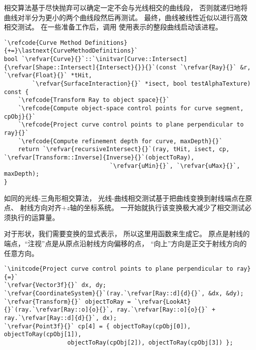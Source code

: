相交算法基于尽快抛弃可以确定一定不会与光线相交的曲线段，
否则就递归地将曲线对半分为更小的两个曲线段然后再测试。
最终，曲线被线性近似以进行高效相交测试。
在一些准备工作后，调用
使用表示的整段曲线启动该进程。
\begin{lstlisting}
`\refcode{Curve Method Definitions}{+=}\lastnext{CurveMethodDefinitions}`
bool `\refvar{Curve}{}`::`\initvar[Curve::Intersect]{\refvar[Shape::Intersect]{Intersect}{}}{}`(const `\refvar{Ray}{}` &r, `\refvar{Float}{}` *tHit,
        `\refvar{SurfaceInteraction}{}` *isect, bool testAlphaTexture) const {
    `\refcode{Transform Ray to object space}{}`
    `\refcode{Compute object-space control points for curve segment, cpObj}{}`
    `\refcode{Project curve control points to plane perpendicular to ray}{}`
    `\refcode{Compute refinement depth for curve, maxDepth}{}`
    return `\refvar{recursiveIntersect}{}`(ray, tHit, isect, cp, `\refvar[Transform::Inverse]{Inverse}{}`(objectToRay),
                              `\refvar{uMin}{}`, `\refvar{uMax}{}`, maxDepth);
}
\end{lstlisting}

如同的光线-三角形相交算法，
光线-曲线相交测试基于把曲线变换到射线端点在原点、
射线方向对齐$+z$轴的坐标系统。
一开始就执行该变换极大减少了相交测试必须执行的运算量。

对于形状，我们需要变换的显式表示，
所以这里用函数来生成它。
原点是射线的端点，“注视”点是从原点沿射线方向偏移的点，
“向上”方向是正交于射线方向的任意方向。
\begin{lstlisting}
`\initcode{Project curve control points to plane perpendicular to ray}{=}`
`\refvar{Vector3f}{}` dx, dy;
`\refvar{CoordinateSystem}{}`(ray.`\refvar[Ray::d]{d}{}`, &dx, &dy);
`\refvar{Transform}{}` objectToRay = `\refvar{LookAt}{}`(ray.`\refvar[Ray::o]{o}{}`, ray.`\refvar[Ray::o]{o}{}` + ray.`\refvar[Ray::d]{d}{}`, dx);
`\refvar{Point3f}{}` cp[4] = { objectToRay(cpObj[0]), objectToRay(cpObj[1]),
                  objectToRay(cpObj[2]), objectToRay(cpObj[3]) };
\end{lstlisting}

